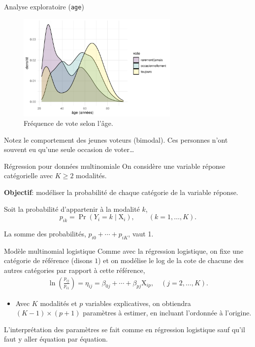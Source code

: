 \documentclass[
  ignorenonframetext,
]{beamer}
\providecommand{\tightlist}{%
  \setlength{\itemsep}{0pt}\setlength{\parskip}{0pt}}\usepackage{longtable,booktabs,array}
\begin{document}
\begin{frame}{Analyse exploratoire (\texttt{age})}
\protect\hypertarget{analyse-exploratoire-age}{}
\begin{figure}

{\centering \includegraphics[width=0.7\textwidth,height=\textheight]{MATH60602-diapos7_files/figure-beamer/fig-vote-age-1.pdf}

}

\caption{\label{fig-vote-age}Fréquence de vote selon l'âge.}

\end{figure}

Notez le comportement des jeunes voteurs (bimodal). Ces personnes n'ont
souvent eu qu'une seule occasion de voter\ldots{}
\end{frame}

\begin{frame}{Régression pour données multinomiale}
\protect\hypertarget{ruxe9gression-pour-donnuxe9es-multinomiale}{}
On considère une variable réponse catégorielle avec \(K \ge 2\)
modalités.

\textbf{Objectif}: modéliser la probabilité de chaque catégorie de la
variable réponse.

Soit la probabilité d'appartenir à la modalité \(k\),
\[p_{ik} = \Pr(Y_i=k \mid \mathrm{X}_i), \qquad (k=1, \ldots, K).\]

La somme des probabilités, \(p_{i0} + \cdots + p_{iK}\), vaut 1.
\end{frame}

\begin{frame}{Modèle multinomial logistique}
\protect\hypertarget{moduxe8le-multinomial-logistique}{}
Comme avec la régression logistique, on fixe une catégorie de référence
(disons \(1\)) et on modélise le log de la cote de chacune des autres
catégories par rapport à cette référence, \begin{align*}
 \ln\left(\frac{p_{ij}}{p_{i1}}\right) = \eta_{ij} = \beta_{0j} + \cdots + \beta_{pj} \mathrm{X}_{ip}, \quad (j=2, \ldots, K).
\end{align*}

\begin{itemize}
\tightlist
\item
  Avec \(K\) modalités et \(p\) variables explicatives, on obtiendra
  \((K-1)\times (p+1)\) paramètres à estimer, en incluant l'ordonnée à
  l'origine.
\end{itemize}

L'interprétation des paramètres se fait comme en régression logistique
sauf qu'il faut y aller équation par équation.
\end{frame}
\end{document}
